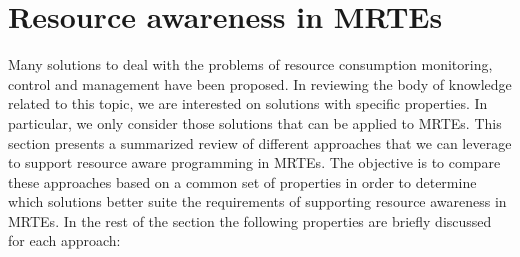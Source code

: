 \section{Resource awareness in MRTEs} \label{sec:resource-awareness-related-work}

Many solutions to deal with the problems of resource consumption monitoring, control and management have been proposed.
In reviewing the body of knowledge related to this topic, we are interested on solutions with specific properties.
In particular, we only consider those solutions that can be applied to MRTEs.
This section presents a summarized review of different approaches that we can leverage to support resource aware programming in MRTEs.
The objective is to compare these approaches based on a common set of properties in order to determine which solutions better suite the requirements of supporting resource awareness in MRTEs.
In the rest of the section the following properties are briefly discussed for each approach: 

